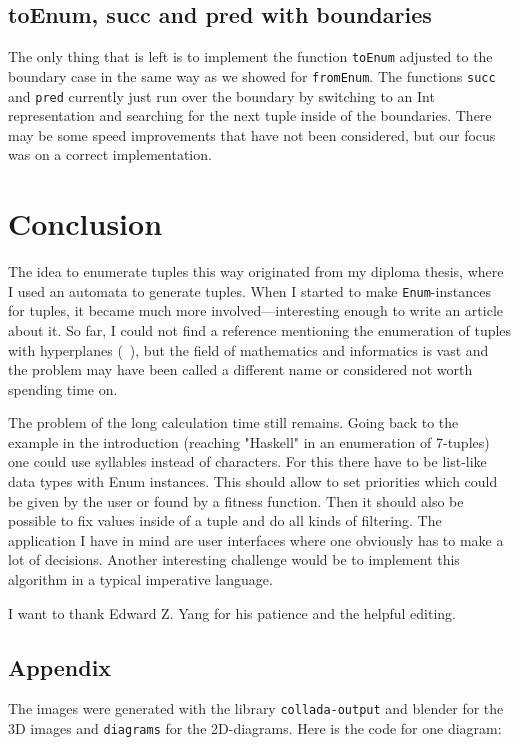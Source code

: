 \documentclass{tmr}
\begin{document}
\subsection{toEnum, succ and pred with boundaries}
The only thing that is left is to implement the function \verb|toEnum| adjusted to the boundary case
in the same way as we showed for \verb|fromEnum|.
The functions \verb|succ| and \verb|pred| currently just run over the boundary by switching
to an Int representation and searching for the next tuple inside of the boundaries.
There may be some speed improvements that have not been considered,
but our focus was on a correct implementation.

\section{Conclusion}
The idea to enumerate tuples this way originated from my diploma thesis, where I used an automata
to generate tuples. When I started to make \verb|Enum|-instances for tuples, it became
much more involved---interesting enough to write an article about it.
So far, I could not find a reference mentioning the enumeration of tuples with
hyperplanes (\eg\ \cite{knuth}), but the field of mathematics and informatics is vast and
the problem may have been called a different name or considered not worth spending time on.

The problem of the long calculation time still remains. Going back to the example in the 
introduction (reaching "Haskell" in an enumeration of 7-tuples) one could use syllables 
instead of characters. For this there have to be list-like data types with Enum instances. 
This should allow to set priorities which could be given by the user or found by a 
fitness function. Then it should also be possible to fix values inside of a tuple and do 
all kinds of filtering.
The application I have in mind are user interfaces where one obviously has to make a lot 
of decisions.
Another interesting challenge would be to implement this algorithm in a typical imperative language.

I want to thank Edward Z. Yang for his patience and the helpful editing.

\subsection{Appendix}

The images were generated with the library \verb|collada-output| and blender for the 3D images 
and \verb|diagrams| for the 2D-diagrams. Here is the code for one diagram:
\end{document}
